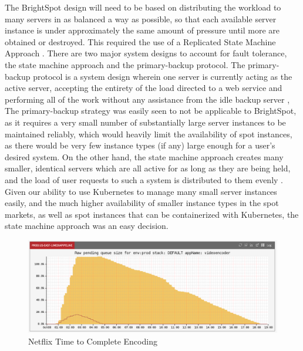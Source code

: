 \documentclass[thesis,proposal]{umassthesis}  %
\begin{document}
The BrightSpot design will need to be based on distributing the workload to many servers in as balanced a way as possible, so that each available server instance is under approximately the same amount of pressure until more are obtained or destroyed. This required the use of a Replicated State Machine Approach \cite{StateMachineApproach}. There are two major system designs to account for fault tolerance, the state machine approach and the primary-backup protocol. The primary-backup protocol is a system design wherein one server is currently acting as the active server, accepting the entirety of the load directed to a web service and performing all of the work without any assistance from the idle backup server \cite{PrimaryBackupProtocol}, The primary-backup strategy was easily seen to not be applicable to BrightSpot, as it requires a very small number of substantially large server instances to be maintained reliably, which would heavily limit the availability of spot instances, as there would be very few instance types (if any) large enough for a user's desired system. On the other hand, the state machine approach creates many smaller, identical servers which are all active for as long as they are being held, and the load of user requests to such a system is distributed to them evenly \cite{StateMachineApproach}. Given our ability to use Kubernetes to manage many small server instances easily, and the much higher availability of smaller instance types in the spot markets, as well as spot instances that can be containerized with Kubernetes, the state machine approach was an easy decision.\par


\begin{figure}
    	\includegraphics[scale=0.25]{Netflix_Spot_Market_Usage}
        \caption{Netflix Time to Complete Encoding}\label{fig:netflix}
\end{figure}
\end{document}
